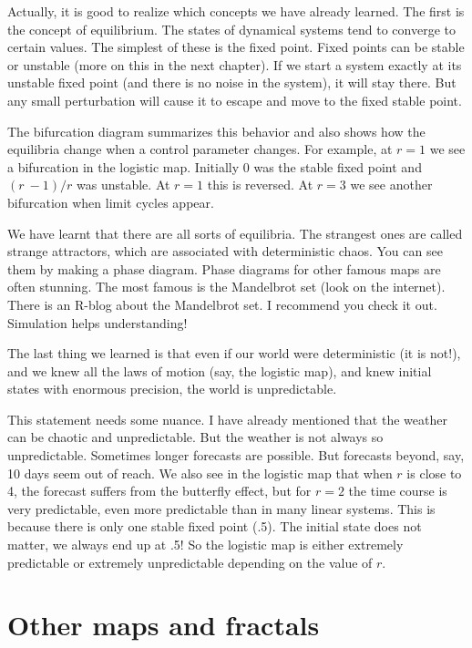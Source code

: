 \documentclass[
  a4paper,
  DIV=11,
  numbers=noendperiod,
  oneside]{scrreprt}
\begin{document}
Actually, it is good to realize which concepts we have already learned.
The first is the concept of equilibrium. The states of dynamical systems
tend to converge to certain values. The simplest of these is the fixed
point. Fixed points can be stable or unstable (more on this in the next
chapter). If we start a system exactly at its unstable fixed point (and
there is no noise in the system), it will stay there. But any small
perturbation will cause it to escape and move to the fixed stable point.

The bifurcation diagram summarizes this behavior and also shows how the
equilibria change when a control parameter changes. For example, at
\(r = 1\) we see a bifurcation in the logistic map. Initially 0 was the
stable fixed point and \((r\  - 1)/r\) was unstable. At \(r = 1\) this
is reversed. At \(r = 3\) we see another bifurcation when limit cycles
appear.

We have learnt that there are all sorts of equilibria. The strangest
ones are called strange attractors, which are associated with
deterministic chaos. You can see them by making a phase diagram. Phase
diagrams for other famous maps are often stunning. The most famous is
the Mandelbrot set (look on the internet). There is an R-blog about the
Mandelbrot set. I recommend you check it out. Simulation helps
understanding!

The last thing we learned is that even if our world were deterministic
(it is not!), and we knew all the laws of motion (say, the logistic
map), and knew initial states with enormous precision, the world is
unpredictable.

This statement needs some nuance. I have already mentioned that the
weather can be chaotic and unpredictable. But the weather is not always
so unpredictable. Sometimes longer forecasts are possible. But forecasts
beyond, say, 10 days seem out of reach. We also see in the logistic map
that when \(r\) is close to 4, the forecast suffers from the butterfly
effect, but for \(r = 2\) the time course is very predictable, even more
predictable than in many linear systems. This is because there is only
one stable fixed point (.5). The initial state does not matter, we
always end up at .5! So the logistic map is either extremely predictable
or extremely unpredictable depending on the value of \(r\).

\hypertarget{sec-Other-maps-and-fractals}{%
\section{Other maps and fractals}\label{sec-Other-maps-and-fractals}}
\end{document}
